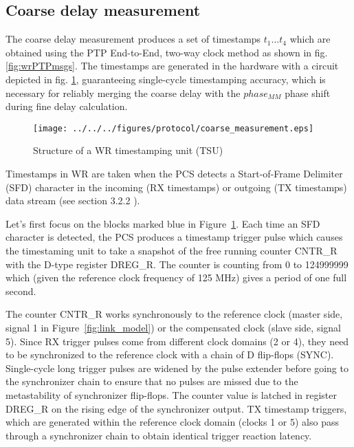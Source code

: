 \subsection{Coarse delay measurement}
\label{s:coarse_delay}
The coarse delay measurement produces a set of timestamps $t_{1} ... t_{4}$
which are obtained using the PTP End-to-End, two-way clock method as shown
in fig. \ref{fig:wrPTPmsgs}. The timestamps are generated in the hardware
with a circuit depicted in fig. \ref{fig:coarse_measurement}, guaranteeing
single-cycle timestamping accuracy, which is necessary for reliably merging the
coarse delay with the $phase_{MM}$ phase shift during fine delay calculation.
\begin{figure}[ht!]
  \centering
  \texttt{[image: ../../../figures/protocol/coarse\_measurement.eps]}
  \caption{Structure of a WR timestamping unit (TSU)}
  \label{fig:coarse_measurement}
\end{figure}
Timestamps in WR are taken when the PCS detects a Start-of-Frame Delimiter
(SFD) character in the incoming (RX timestamps) or outgoing (TX timestamps)
data stream (see section 3.2.2 \cite{tomekMSC}).

Let's first focus on the blocks marked blue in
Figure~\ref{fig:coarse_measurement}. Each time an SFD character is detected,
the PCS produces a timestamp trigger pulse which causes the timestaming unit
to take a snapshot of the free running counter CNTR\_R with the D-type
register DREG\_R. The counter is counting from 0 to 124999999 which (given
the reference clock frequency of 125 MHz) gives a period of one full second.

The counter CNTR\_R works synchronously to the reference clock (master side,
signal 1 in Figure~\ref{fig:link_model}) or the compensated clock (slave side,
signal 5). Since RX trigger pulses come from different clock domains (2 or
4), they need to be synchronized to the reference clock with a chain of
D flip-flops (SYNC). Single-cycle long trigger pulses are widened by the
pulse extender before going to the synchronizer chain to ensure that no
pulses are missed due to the metastability of synchronizer flip-flops. The
counter value is latched in register DREG\_R on the rising edge of the
synchronizer output. TX timestamp triggers, which are generated within the
reference clock domain (clocks 1 or 5) also pass through a synchronizer
chain to obtain identical trigger reaction latency.

